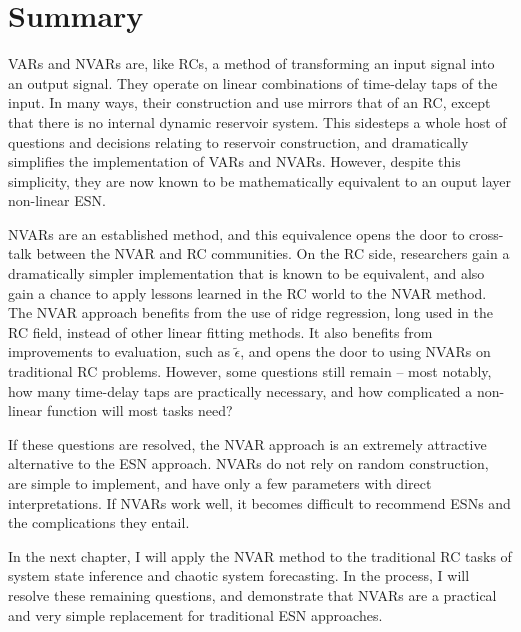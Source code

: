 \section{Summary}

VARs and NVARs are, like RCs, a method of transforming an input signal
into an output signal. They operate on linear combinations of
time-delay taps of the input. In many ways, their construction and use
mirrors that of an RC, except that there is no internal dynamic
reservoir system. This sidesteps a whole host of questions and
decisions relating to reservoir construction, and dramatically
simplifies the implementation of VARs and NVARs. However, despite this
simplicity, they are now known to be mathematically equivalent to an
ouput layer non-linear ESN.

NVARs are an established method, and this equivalence opens the door
to cross-talk between the NVAR and RC communities. On the RC side,
researchers gain a dramatically simpler implementation that is known
to be equivalent, and also gain a chance to apply lessons learned in
the RC world to the NVAR method. The NVAR approach benefits from the
use of ridge regression, long used in the RC field, instead of other
linear fitting methods.  It also benefits from improvements to
evaluation, such as $\tilde{\epsilon}$, and opens the door to using
NVARs on traditional RC problems. However, some questions still
remain -- most notably, how many time-delay taps are practically
necessary, and how complicated a non-linear function will most tasks
need?

If these questions are resolved, the NVAR approach is an extremely
attractive alternative to the ESN approach. NVARs do not rely on
random construction, are simple to implement, and have only a few
parameters with direct interpretations. If NVARs work well, it becomes
difficult to recommend ESNs and the complications they entail.

In the next chapter, I will apply the NVAR method to the traditional
RC tasks of system state inference and chaotic system forecasting. In
the process, I will resolve these remaining questions, and demonstrate
that NVARs are a practical and very simple replacement for traditional
ESN approaches.
